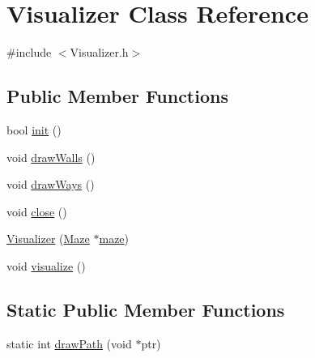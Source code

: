 \hypertarget{class_visualizer}{}\section{Visualizer Class Reference}
\label{class_visualizer}


{\ttfamily \#include $<$Visualizer.\+h$>$}

\subsection*{Public Member Functions}
\begin{DoxyCompactItemize}
\item 
bool \hyperlink{class_visualizer_a80420c54a397dead25f3b2540d290c58}{init} ()
\item 
void \hyperlink{class_visualizer_a1bfbbd16ae137b3f3e584469d336476a}{draw\+Walls} ()
\item 
void \hyperlink{class_visualizer_ae01e3c8d5389b0a9dcd17c4e1c5fab01}{draw\+Ways} ()
\item 
void \hyperlink{class_visualizer_aed71b7ecab67393c5a6805d4bc573f7b}{close} ()
\item 
\hyperlink{class_visualizer_ae325a113b562ffc80a45416218184b27}{Visualizer} (\hyperlink{class_maze}{Maze} $\ast$\hyperlink{class_visualizer_a6a395e1836267177157554215304cb15}{maze})
\item 
void \hyperlink{class_visualizer_ad772d4b6adce1a7bd9bb019b90d33f39}{visualize} ()
\end{DoxyCompactItemize}
\subsection*{Static Public Member Functions}
\begin{DoxyCompactItemize}
\item 
static int \hyperlink{class_visualizer_ab22c92427c3f8f3cc27a54b2b6724ba3}{draw\+Path} (void $\ast$ptr)
\end{DoxyCompactItemize}
